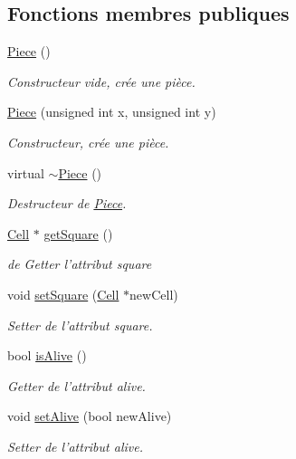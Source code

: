 \subsection*{Fonctions membres publiques}
\begin{DoxyCompactItemize}
\item 
\hyperlink{class_piece_ac57de5803bbad829b143bc7268267dc1}{Piece} ()
\begin{DoxyCompactList}\small\item\em Constructeur vide, crée une pièce. \end{DoxyCompactList}\item 
\hyperlink{class_piece_a26c8c5a537f1733833787820d3f1ff01}{Piece} (unsigned int x, unsigned int y)
\begin{DoxyCompactList}\small\item\em Constructeur, crée une pièce. \end{DoxyCompactList}\item 
virtual \hyperlink{class_piece_a5d7a4f6bade94cb33b6f634de8aa7918}{$\sim$\-Piece} ()
\begin{DoxyCompactList}\small\item\em Destructeur de \hyperlink{class_piece}{Piece}. \end{DoxyCompactList}\item 
\hyperlink{class_cell}{Cell} $\ast$ \hyperlink{class_piece_a91fddbcc85fe9fbbca1897079ce9b9e5}{get\-Square} ()
\begin{DoxyCompactList}\small\item\em de Getter l'attribut square \end{DoxyCompactList}\item 
void \hyperlink{class_piece_af405feca349d71dfacb20b128c3cc686}{set\-Square} (\hyperlink{class_cell}{Cell} $\ast$new\-Cell)
\begin{DoxyCompactList}\small\item\em Setter de l'attribut square. \end{DoxyCompactList}\item 
bool \hyperlink{class_piece_a9f6a89d6fd5ae865af73c2220d1a5839}{is\-Alive} ()
\begin{DoxyCompactList}\small\item\em Getter de l'attribut alive. \end{DoxyCompactList}\item 
void \hyperlink{class_piece_ad4161cd37efb373e08b50cdf43b07b5f}{set\-Alive} (bool new\-Alive)
\begin{DoxyCompactList}\small\item\em Setter de l'attribut alive. \end{DoxyCompactList}\item 

\end{DoxyCompactItemize}
